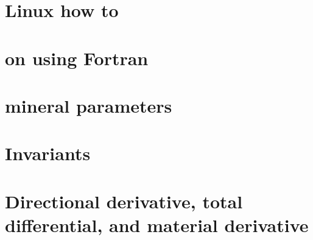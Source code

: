 \documentclass[a4paper]{article}
\numberwithin{equation}{section}
\begin{document}
\section{Linux how to}  %
\newpage %
\section{on using Fortran}  %
\newpage %
\section{mineral parameters}  %
\newpage %
\section{Invariants \label{app:invariants}}  %
\newpage %
\section{Directional derivative, total differential, and material derivative \label{app:ders}} 
\end{document}

